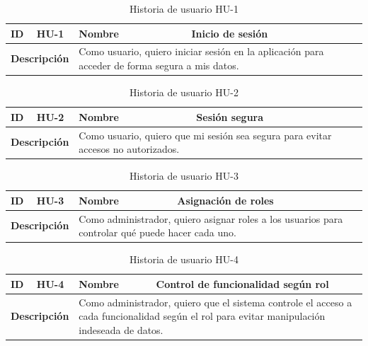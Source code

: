 \begin{table}[H]
    \centering
    \begin{tabular}{|p{2cm}|p{4cm}|p{2cm}|p{4cm}|}
        \hline
        \textbf{ID} & HU-1 & \textbf{Nombre} & Inicio de sesión \\
        \hline
        \multicolumn{2}{|p{6cm}|}{\textbf{Descripción}} & \multicolumn{2}{p{6cm}|}{Como usuario, quiero iniciar sesión en la aplicación para acceder de forma segura a mis datos.} \\
        \hline
    \end{tabular}
    \caption{Historia de usuario HU-1}
    \label{tab:hu_1}
\end{table}

\begin{table}[H]
    \centering
    \begin{tabular}{|p{2cm}|p{4cm}|p{2cm}|p{4cm}|}
        \hline
        \textbf{ID} & HU-2 & \textbf{Nombre} & Sesión segura \\
        \hline
        \multicolumn{2}{|p{6cm}|}{\textbf{Descripción}} & \multicolumn{2}{p{6cm}|}{Como usuario, quiero que mi sesión sea segura para evitar accesos no autorizados.} \\
        \hline
    \end{tabular}
    \caption{Historia de usuario HU-2}
    \label{tab:hu_2}
\end{table}

\begin{table}[H]
    \centering
    \begin{tabular}{|p{2cm}|p{4cm}|p{2cm}|p{4cm}|}
        \hline
        \textbf{ID} & HU-3 & \textbf{Nombre} & Asignación de roles \\
        \hline
        \multicolumn{2}{|p{6cm}|}{\textbf{Descripción}} & \multicolumn{2}{p{6cm}|}{Como administrador, quiero asignar roles a los usuarios para controlar qué puede hacer cada uno.} \\
        \hline
    \end{tabular}
    \caption{Historia de usuario HU-3}
    \label{tab:hu_3}
\end{table}

\begin{table}[H]
    \centering
    \begin{tabular}{|p{2cm}|p{4cm}|p{2cm}|p{4cm}|}
        \hline
        \textbf{ID} & HU-4 & \textbf{Nombre} & Control de funcionalidad según rol \\
        \hline
        \multicolumn{2}{|p{6cm}|}{\textbf{Descripción}} & \multicolumn{2}{p{6cm}|}{Como administrador, quiero que el sistema controle el acceso a cada funcionalidad según el rol para evitar manipulación indeseada de datos.} \\
        \hline
    \end{tabular}
    \caption{Historia de usuario HU-4}
    \label{tab:hu_4}
\end{table}

